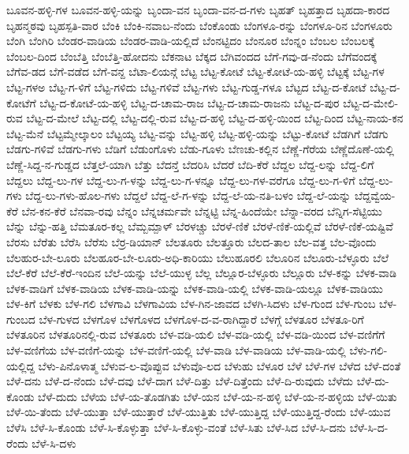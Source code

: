 ಬೂವನ-ಹಳ್ಳಿ-ಗಳ
ಬೂವನ-ಹಳ್ಳಿ-ಯನ್ನು
ಬೃಂದಾ-ವನ
ಬೃಂದಾ-ವನ-ದ-ಗಳು
ಬೃಹತ್
ಬೃಹತ್ತಾದ
ಬೃಹದಾ-ಕಾರದ
ಬೃಹನ್ಮಠವು
ಬೃಹಸ್ಪತಿ-ವಾರ
ಬೆಂಕಿ
ಬೆಂಕಿ-ನವಾಬ-ನೆಂದು
ಬೆಂಕೊಂಡು
ಬೆಂಗಳೂ-ರನ್ನು
ಬೆಂಗಳೂ-ರಿನ
ಬೆಂಗಳೂರು
ಬೆಂಗಿ
ಬೆಂಗಿರಿ
ಬೆಂಡರ-ವಾಡಿಯ
ಬೆಂಡರ-ವಾಡಿ-ಯಲ್ಲಿದೆ
ಬೆಂನಟ್ಟಿದಂ
ಬೆಂನೂರ
ಬೆಂನ್ನಂ
ಬೆಂಬಲ
ಬೆಂಬಲಕ್ಕೆ
ಬೆಂಬಲ-ದಿಂದ
ಬೆಂಬೆತ್ತಿ
ಬೆಂಬೆತ್ತಿ-ಹೋದನು
ಬೆಕನಾಟ
ಬೆಕ್ಕದ
ಬೆಗಿವಂದದ
ಬೆಗೆ-ಗವು-ಡ-ನೆಂದು
ಬೆಗೆವಂದಕ್ಕೆ
ಬೆಗೆವ-ಡದ
ಬೆಗೆ-ವಡೆದ
ಬೆಗೆ-ವನ್ದ
ಬೆಟಾ-ಲಿಯನ್ಗೆ
ಬೆಟ್ಟ
ಬೆಟ್ಟ-ಕೋಟೆ
ಬೆಟ್ಟ-ಕೋಟೆ-ಯ-ಹಳ್ಳಿ
ಬೆಟ್ಟಕ್ಕೆ
ಬೆಟ್ಟ-ಗಳ
ಬೆಟ್ಟ-ಗಳಅ
ಬೆಟ್ಟ-ಗ-ಳಿಗೆ
ಬೆಟ್ಟ-ಗಳಿದು
ಬೆಟ್ಟ-ಗಳಿವೆ
ಬೆಟ್ಟ-ಗಳು
ಬೆಟ್ಟ-ಗುಡ್ಡ-ಗಳೂ
ಬೆಟ್ಟದ
ಬೆಟ್ಟ-ದ-ಕೋಟೆ
ಬೆಟ್ಟ-ದ-ಕೋಟೆಗೆ
ಬೆಟ್ಟ-ದ-ಕೋಟೆ-ಯ-ಹಳ್ಳಿ
ಬೆಟ್ಟ-ದ-ಚಾಮ-ರಾಜ
ಬೆಟ್ಟ-ದ-ಚಾಮ-ರಾಜನು
ಬೆಟ್ಟ-ದ-ಪುರ
ಬೆಟ್ಟ-ದ-ಮೇಲಿ-ರುವ
ಬೆಟ್ಟ-ದ-ಮೇಲೆ
ಬೆಟ್ಟ-ದಲ್ಲಿ
ಬೆಟ್ಟ-ದಲ್ಲಿ-ರುವ
ಬೆಟ್ಟ-ದ-ಹಳ್ಳಿ
ಬೆಟ್ಟ-ದ-ಹಳ್ಳಿ-ಯಿಂದ
ಬೆಟ್ಟ-ದಿಂದ
ಬೆಟ್ಟ-ನಾಯ-ಕನ
ಬೆಟ್ಟ-ಮೆನೆ
ಬೆಟ್ಟಮ್ಮೇಲ್ಕಾಲಂ
ಬೆಟ್ಟಯ್ಯ
ಬೆಟ್ಟ-ವನ್ನು
ಬೆಟ್ಟ-ಹಳ್ಳಿ
ಬೆಟ್ಟ-ಹಳ್ಳಿ-ಯನ್ನು
ಬೆಟ್ಟು-ಕೋಟೆ
ಬೆಡಗಿಗೆ
ಬೆಡಗು
ಬೆಡಗು-ಗಳಿವೆ
ಬೆಡಗು-ಗಳು
ಬೆಡಿಗೆ
ಬೆಡುಂಗೊಳು
ಬೆಡು-ಗೂಳು
ಬೆಣಚು-ಕಲ್ಲಿನ
ಬೆಣ್ಣೆ-ಗೆರೆಯ
ಬೆಣ್ಣೆದೊಣೆ-ಯಲ್ಲಿ
ಬೆಣ್ಣೆ-ಸಿದ್ದ-ನ-ಗುಡ್ಡದ
ಬೆತ್ತಲೆ-ಯಾಗಿ
ಬೆತ್ತು
ಬೆದನ್ತೆ
ಬೆದರಿಸಿ
ಬೆದರೆ
ಬೆದಿ-ಕೆರೆ
ಬೆದ್ದಲ
ಬೆದ್ದ-ಲನ್ನು
ಬೆದ್ದ-ಲಿಗೆ
ಬೆದ್ದಲು
ಬೆದ್ದ-ಲು-ಗಳ
ಬೆದ್ದ-ಲು-ಗ-ಳನ್ನು
ಬೆದ್ದ-ಲು-ಗ-ಳನ್ನೂ
ಬೆದ್ದ-ಲು-ಗಳ-ವರೆಗೂ
ಬೆದ್ದ-ಲು-ಗ-ಳಿಗೆ
ಬೆದ್ದ-ಲು-ಗಳು
ಬೆದ್ದ-ಲು-ಗಳು-ಹೊಲ-ಗಳು
ಬೆದ್ದಲೆ
ಬೆದ್ದ-ಲೆ-ಗ-ಳನ್ನು
ಬೆದ್ದ-ಲೆ-ಯ-ನತಿ-ಬಳಂ
ಬೆದ್ದ-ಲೆ-ಯನ್ನು
ಬೆದ್ದವ್ವೆಯ-ಕೆರೆ
ಬೆನ-ಕನ-ಕೆರೆ
ಬೆನವಾ-ರವು
ಬೆನ್ನಂ
ಬೆನ್ನಚರ್ಮವೇ
ಬೆನ್ನಟ್ಟಿ
ಬೆನ್ನ-ಹಿಂದೆಯೇ
ಬೆನ್ನಾ-ವರದ
ಬೆನ್ನಿಗ-ಸೆಟ್ಟಿಯು
ಬೆನ್ನು
ಬೆನ್ನು-ಹತ್ತಿ
ಬೆಮತೂರ-ಕಲ್ಲ
ಬೆಮ್ಬಮ್ಪಾಳ್
ಬೆರಳಚ್ಚು
ಬೆರಳೆ-ಣಿಕೆ
ಬೆರಳೆ-ಣಿಕೆ-ಯಲ್ಲಿವೆ
ಬೆರಳೆ-ಣಿಕೆ-ಯಷ್ಟಿವೆ
ಬೆರಸು
ಬೆರೆತು
ಬೆರೆಸಿ
ಬೆರೆಸು
ಬೆರ್ರ-ಡಿಯಾನ್
ಬೆಲತೂರು
ಬೆಲತ್ತೂರು
ಬೆಲದ-ತಾಲ
ಬೆಲ-ವತ್ತ
ಬೆಲ-ವೊಂದು
ಬೆಲಹುರ-ಬೇ-ಲೂರು
ಬೆಲಹೂರ-ಬೇ-ಲೂರು-ಅಧಿ-ಕಾರಿಯು
ಬೆಲುಹೂರಲಿ
ಬೆಲೂರಿನ
ಬೆಲೂರು-ಬೆಳ್ಳೂರು
ಬೆಲೆ
ಬೆಲೆ-ಕೆರೆ
ಬೆಲೆ-ಕೆರೆ-ಇಂದಿನ
ಬೆಲೆ-ಯನ್ನು
ಬೆಲೆ-ಯುಳ್ಳ
ಬೆಲ್ಲ
ಬೆಲ್ಲೂರ-ಬೆಳ್ಳೂರು
ಬೆಲ್ಲೂರು
ಬೆಳ-ಕನ್ನು
ಬೆಳಕ-ವಾಡಿ
ಬೆಳಕ-ವಾಡಿಗೆ
ಬೆಳಕ-ವಾಡಿಯ
ಬೆಳಕ-ವಾಡಿ-ಯನ್ನು
ಬೆಳಕ-ವಾಡಿ-ಯಲ್ಲಿ
ಬೆಳಕ-ವಾಡಿ-ಯಲ್ಲೂ
ಬೆಳಕ-ವಾಡಿಯು
ಬೆಳ-ಕಿಗೆ
ಬೆಳಕು
ಬೆಳ-ಗಲಿ
ಬೆಳಗಾವಿ
ಬೆಳಗಾವಿಯ
ಬೆಳ-ಗಿನ-ಜಾವದ
ಬೆಳಗಿ-ಸಿದಳು
ಬೆಳ-ಗುಂದ
ಬೆಳ-ಗುಂಬ
ಬೆಳ-ಗುಂಬದ
ಬೆಳ-ಗುಳದ
ಬೆಳಗೊಳ
ಬೆಳಗೊಳದ
ಬೆಳಗೊಳ-ದ-ವ-ರಾಗಿದ್ದಾರೆ
ಬೆಳಗ್ಗೆ
ಬೆಳತೂರ
ಬೆಳತೂ-ರಿಗೆ
ಬೆಳತೂರಿನ
ಬೆಳತೂರಿನಲ್ಲಿ-ರುವ
ಬೆಳತೂರು
ಬೆಳ-ವಡಿ-ಯಲಿ
ಬೆಳ-ವಡಿ-ಯಲ್ಲಿ
ಬೆಳ-ವಡಿ-ಯಿಂದ
ಬೆಳ-ವಣಿಗೆಗೆ
ಬೆಳ-ವಣಿಗೆಯ
ಬೆಳ-ವಣಿಗೆ-ಯನ್ನು
ಬೆಳ-ವಣಿಗೆ-ಯಲ್ಲಿ
ಬೆಳ-ವಾಡಿ
ಬೆಳ-ವಾಡಿಯ
ಬೆಳ-ವಾಡಿ-ಯಲ್ಲಿ
ಬೆಳು-ಗಲಿ-ಯಲ್ಲಿದ್ದ
ಬೆಳು-ಪಿನೊಳಾತ್ಮ
ಬೆಳುವ-ಲ-ವೊಪ್ಪುವ
ಬೆಳುವೊ-ಲದ
ಬೆಳುಹು
ಬೆಳೂರ
ಬೆಳೆ
ಬೆಳೆ-ಗಳ
ಬೆಳೆದ
ಬೆಳೆ-ದಂತೆ
ಬೆಳೆ-ದನು
ಬೆಳೆ-ದ-ನೆಂದು
ಬೆಳೆ-ದವು
ಬೆಳೆ-ದಾಗ
ಬೆಳೆ-ದಿತ್ತು
ಬೆಳೆ-ದಿತ್ತೆಂದು
ಬೆಳೆ-ದಿ-ರುವುದು
ಬೆಳೆದು
ಬೆಳೆ-ದು-ಕೊಂಡು
ಬೆಳೆ-ದುದು
ಬೆಳೆಯ
ಬೆಳೆ-ಯ-ತೊಡಗಿತು
ಬೆಳೆ-ಯನ
ಬೆಳೆ-ಯ-ನ-ಹಳ್ಳಿ
ಬೆಳೆ-ಯ-ನ-ಹಳ್ಳಿಯ
ಬೆಳೆ-ಯಿತು
ಬೆಳೆ-ಯಿ-ತೆಂದು
ಬೆಳೆ-ಯುತ್ತಾ
ಬೆಳೆ-ಯುತ್ತಾರೆ
ಬೆಳೆ-ಯುತ್ತಿತು
ಬೆಳೆ-ಯುತ್ತಿದ್ದ
ಬೆಳೆ-ಯುತ್ತಿದ್ದ-ರೆಂದು
ಬೆಳೆ-ಯುವ
ಬೆಳೆಸಿ
ಬೆಳೆ-ಸಿ-ಕೊಂಡು
ಬೆಳೆ-ಸಿ-ಕೊಳ್ಳುತ್ತಾ
ಬೆಳೆ-ಸಿ-ಕೊಳ್ಳು-ವಂತೆ
ಬೆಳೆ-ಸಿತು
ಬೆಳೆ-ಸಿದ
ಬೆಳೆ-ಸಿ-ದನು
ಬೆಳೆ-ಸಿ-ದ-ರೆಂದು
ಬೆಳೆ-ಸಿ-ದಳು
